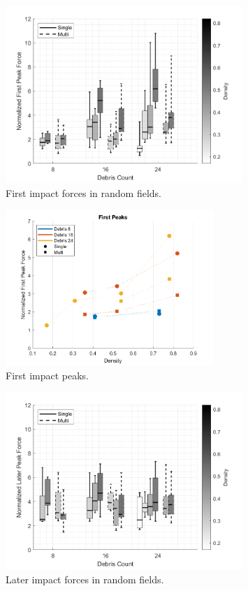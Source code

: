 \documentclass{article}
\begin{document}
\begin{figure}[htbp]
    \centering
    \includegraphics[width=0.8\textwidth]{First_Peak_Random_Single_vs_Multi_ByDensityGradient.png}
    \caption{First impact forces in random fields.}
    \label{fig:random_peaks_first}
\end{figure}

\begin{figure}[htbp]
    \centering
    \includegraphics[width=0.7\textwidth]{Impact_FirstPeaks_densities_combined.png}
    \caption{First impact peaks. }
    \label{fig:first_peaks_combined}
\end{figure}

\begin{figure}[htbp]
    \centering
    \includegraphics[width=0.8\textwidth]{Later_Peak_Random_Single_vs_Multi_ByDensityGradient.png}
    \caption{Later impact forces in random fields.}
    \label{fig:random_peaks_later}
\end{figure}
\end{document}
